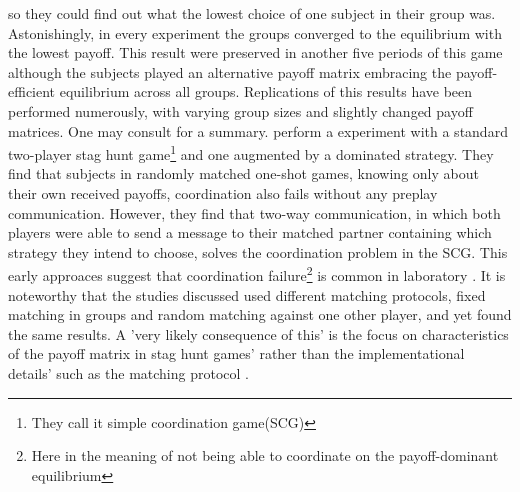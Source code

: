 \documentclass[12pt]{article}
\begin{document}
so they could find out what the lowest choice of one subject in their group was.
Astonishingly, in every experiment the groups converged
to the equilibrium with the lowest payoff. This result were preserved in another 
five periods of this game although the subjects played an alternative payoff
matrix embracing the payoff-efficient equilibrium across all groups. 
Replications of this results have been performed numerously, with varying group
sizes and slightly changed payoff matrices. One may consult \textcite{devetag_when_2007}
for a summary. 
\textcite{cooper_communication_1992} perform a experiment with a standard two-player stag
hunt game\footnote{They call it simple coordination game(SCG)} 
and one augmented by a dominated strategy. They find that 
subjects in randomly matched one-shot games, knowing only about their own
received payoffs, coordination also fails without any preplay communication. 
However, they find that two-way communication, in which both players were
able to send a message to their matched partner containing which strategy
they intend to choose, solves the coordination problem in the SCG. 
This early approaces suggest that coordination failure\footnote{Here in the 
meaning of not being able to coordinate on the payoff-dominant equilibrium} is
common in laboratory \parencite{devetag_when_2007}. It is noteworthy that the studies 
discussed used different matching protocols, fixed matching in groups and 
random matching against one other player, and yet found the same results. 
A 'very likely consequence of this' is the focus on characteristics of the
payoff matrix in stag hunt games' rather than the implementational details' 
such as the matching protocol \parencite{devetag_when_2007}.
\end{document}
